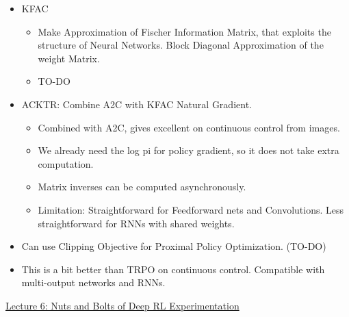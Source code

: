 \begin{itemize}[noitemsep,nolistsep]
\begin{itemize}
	\end{itemize}
	\item KFAC
	\begin{itemize}[noitemsep,nolistsep]
		\item Make Approximation of Fischer Information Matrix, that exploits the structure of Neural Networks. Block Diagonal Approximation of the weight Matrix.
		\item TO-DO
	\end{itemize}
	\item ACKTR: Combine A2C with KFAC Natural Gradient.
	\begin{itemize}[noitemsep,nolistsep]
		\item Combined with A2C, gives excellent on continuous control from images.
		\item We already need the log pi for policy gradient, so it does not take extra computation.
		\item Matrix inverses can be computed asynchronously.
		\item Limitation: Straightforward for Feedforward nets and Convolutions. Less straightforward for RNNs with shared weights.
	\end{itemize}
	\item Can use Clipping Objective for Proximal Policy Optimization. (TO-DO)
	\item This is a bit better than TRPO on continuous control. Compatible with multi-output networks and RNNs.
\end{itemize}
\href{https://www.youtube.com/watch?v=xvRrgxcpaHY}{Lecture 6: Nuts and Bolts of Deep RL Experimentation}
